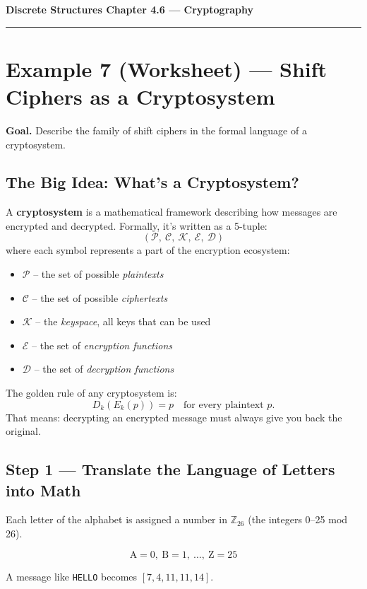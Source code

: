 \documentclass[12pt]{article}
\begin{document}
{\large \textbf{Discrete Structures \quad Chapter 4.6 — Cryptography}}

\hrule
\vspace{0.5em}

\section*{Example 7 (Worksheet) — Shift Ciphers as a Cryptosystem}

\textbf{Goal.} Describe the family of shift ciphers in the formal language of a cryptosystem.

\subsection*{The Big Idea: What’s a Cryptosystem?}
A \textbf{cryptosystem} is a mathematical framework describing how messages are encrypted and decrypted.  
Formally, it’s written as a 5-tuple:
\[
(\mathcal{P},\ \mathcal{C},\ \mathcal{K},\ \mathcal{E},\ \mathcal{D})
\]
where each symbol represents a part of the encryption ecosystem:

\begin{itemize}[leftmargin=2em]
  \item $\mathcal{P}$ – the set of possible \emph{plaintexts}
  \item $\mathcal{C}$ – the set of possible \emph{ciphertexts}
  \item $\mathcal{K}$ – the \emph{keyspace}, all keys that can be used
  \item $\mathcal{E}$ – the set of \emph{encryption functions}
  \item $\mathcal{D}$ – the set of \emph{decryption functions}
\end{itemize}

The golden rule of any cryptosystem is:
\[
D_k(E_k(p)) = p \quad \text{for every plaintext } p.
\]
That means: decrypting an encrypted message must always give you back the original.

\subsection*{Step 1 — Translate the Language of Letters into Math}
Each letter of the alphabet is assigned a number in $\mathbb{Z}_{26}$ (the integers 0–25 mod 26).

\[
\text{A}=0, \ \text{B}=1, \ \ldots, \ \text{Z}=25
\]

A message like \texttt{HELLO} becomes \([7,4,11,11,14]\).
\end{document}
